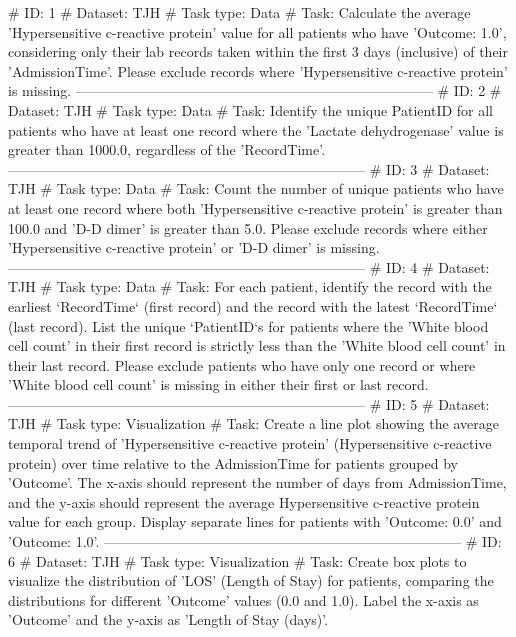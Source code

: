 
\begin{tcolorbox}[colback=cadmiumgreen!5!white,colframe=forestgreen!75!white,breakable,title=\textit{Generated analytical tasks in task 4.}]
\begin{VerbatimWrap}
# ID: 1  
# Dataset: TJH 
# Task type: Data
# Task: Calculate the average 'Hypersensitive c-reactive protein' value for all patients who have 'Outcome: 1.0', considering only their lab records taken within the first 3 days (inclusive) of their 'AdmissionTime'. Please exclude records where 'Hypersensitive c-reactive protein' is missing.
-----------------------------------------------------------------------------
# ID: 2  
# Dataset: TJH 
# Task type: Data
# Task: Identify the unique PatientID for all patients who have at least one record where the 'Lactate dehydrogenase' value is greater than 1000.0, regardless of the 'RecordTime'.
-----------------------------------------------------------------------------
# ID: 3  
# Dataset: TJH 
# Task type: Data
# Task: Count the number of unique patients who have at least one record where both 'Hypersensitive c-reactive protein' is greater than 100.0 and 'D-D dimer' is greater than 5.0. Please exclude records where either 'Hypersensitive c-reactive protein' or 'D-D dimer' is missing.
-----------------------------------------------------------------------------
# ID: 4  
# Dataset: TJH 
# Task type: Data
# Task: For each patient, identify the record with the earliest `RecordTime` (first record) and the record with the latest `RecordTime` (last record). List the unique `PatientID`s for patients where the 'White blood cell count' in their first record is strictly less than the 'White blood cell count' in their last record. Please exclude patients who have only one record or where 'White blood cell count' is missing in either their first or last record.
-----------------------------------------------------------------------------
# ID: 5  
# Dataset: TJH 
# Task type: Visualization
# Task: Create a line plot showing the average temporal trend of 'Hypersensitive c-reactive protein' (Hypersensitive c-reactive protein) over time relative to the AdmissionTime for patients grouped by 'Outcome'. The x-axis should represent the number of days from AdmissionTime, and the y-axis should represent the average Hypersensitive c-reactive protein value for each group. Display separate lines for patients with 'Outcome: 0.0' and 'Outcome: 1.0'.
-----------------------------------------------------------------------------
# ID: 6  
# Dataset: TJH 
# Task type: Visualization
# Task: Create box plots to visualize the distribution of 'LOS' (Length of Stay) for patients, comparing the distributions for different 'Outcome' values (0.0 and 1.0). Label the x-axis as 'Outcome' and the y-axis as 'Length of Stay (days)'.

\end{VerbatimWrap}
\end{tcolorbox}
